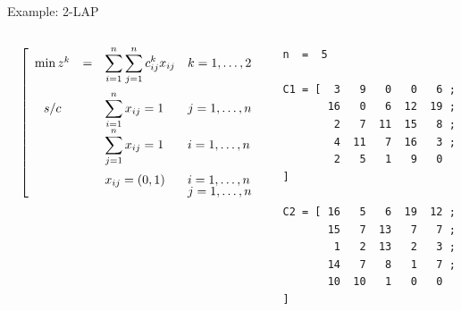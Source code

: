\documentclass[10pt,xcolor=dvipsnames]{beamer}
\begin{document}
\begin{frame}[fragile=singleslide]{Example: 2-LAP }

\begin{columns}
%
\begin{column}{0.6\textwidth}
{\footnotesize
\hspace{0mm}
$
\quad
\left [
\begin{array}{cllllll}

  \min z^k&  =  & \displaystyle{\sum_{i=1}^{n}\sum_{j=1}^{n} c^k_{ij} x_{ij}}  &  k=1,\dots,2\vspace{2mm} \\

  s/c &\  &   \displaystyle{\sum_{i=1}^{n}  x_{ij}}   =  1 &   j=1,\dots ,n \  \ \  \\
        &  &   \displaystyle{\sum_{j=1}^{n}  x_{ij}}   =  1 &  i=1,\dots ,n \    \vspace{2mm} \\

&  &   x_{ij} = (0,1) &   i=1,\dots ,n  \vspace{-1mm}\\
&  &    &  j=1,\dots ,n\\ 
 
\end{array}
\right ]
$
}
\end{column}
%
\begin{column}{0.4\textwidth}
{\scriptsize
\begin{verbatim}
n  =  5

C1 = [  3   9   0   0   6 ;
       16   0   6  12  19 ;
        2   7  11  15   8 ;
        4  11   7  16   3 ;
        2   5   1   9   0   ]

C2 = [ 16   5   6  19  12 ;
       15   7  13   7   7 ;
        1   2  13   2   3 ;
       14   7   8   1   7 ;
       10  10   1   0   0   ]
\end{verbatim}
}
\end{column}
%
\end{columns}
\end{frame}
\end{document}
